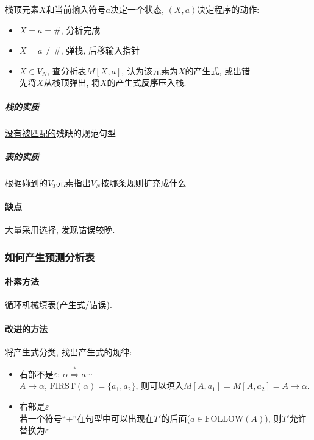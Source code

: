             栈顶元素$X$和当前输入符号$a$决定一个\textsf{状态}, $(X,a)$决定程序的动作:
            \begin{itemize}
                \item $X=a=\#$, 分析完成
                \item $X=a\not =\#$, 弹栈, 后移输入指针
                \item $X\in V_N$, 查分析表$M[X,a]$, 认为该元素为$X$的产生式, 或出错 \\
                    先将$X$从栈顶弹出, 将$X$的产生式\textbf{反序}压入栈.
            \end{itemize}

                \subparagraph{栈的实质} \underline{没有被匹配的}残缺的规范句型
                
                \subparagraph{表的实质} 根据碰到的$V_T$元素指出$V_N$按哪条规则扩充成什么

            \paragraph{缺点} 大量采用选择, 发现错误较晚.

        \subsubsection{如何产生预测分析表}

            \paragraph{朴素方法} 循环机械填表(产生式/错误).

            \paragraph{改进的方法} 将产生式分类, 找出产生式的规律:
                \begin{itemize}
                    \item 右部不是$\varepsilon$: $\alpha\stackrel{*}{\Rightarrow}a\cdots$\\
                        $A\to \alpha$, FIRST$(\alpha)=\{a_1,a_2\}$, 则可以填入$M[A,a_1]=M[A,a_2]=A\to\alpha$.
                    \item 右部是$\varepsilon$ \\
                        若一个符号``+''在句型中可以出现在$T'$的后面($a\in\mathrm{FOLLOW}(A)$), 则$T'$允许替换为$\varepsilon$
                \end{itemize}

